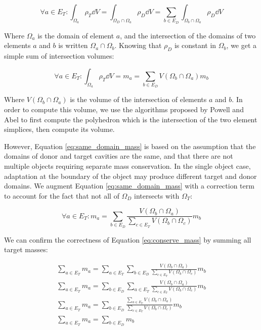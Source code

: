 \begin{equation}
\forall a \in E_T: \int_{\Omega_a} \rho_T \dd V
= \int_{\Omega_D \cap \Omega_a} \rho_D \dd V
= \sum_{b \in E_D} \int_{\Omega_b \cap \Omega_a} \rho_D \dd V
\end{equation}

Where $\Omega_a$ is the domain of element $a$, and the intersection of the
domains of two elements $a$ and $b$ is written $\Omega_a \cap \Omega_b$.
Knowing that $\rho_D$ is constant in $\Omega_b$, we get a simple
sum of intersection volumes:

\begin{equation} \label{eq:same_domain_mass}
\forall a \in E_T: \int_{\Omega_a} \rho_T \dd V = m_a
= \sum_{b \in E_D} V(\Omega_b \cap \Omega_a) m_b
\end{equation}

Where $V(\Omega_b \cap \Omega_a)$ is the volume of the intersection of elements $a$ and $b$.
In order to compute this volume, we use the algorithms
proposed by Powell and Abel \cite{powell2015exact} to first compute the polyhedron
which is the intersection of the two element simplices, then compute
its volume.

However, Equation \ref{eq:same_domain_mass} is based on the assumption
that the domains of donor and target cavities are the same, and that
there are not multiple objects requiring separate mass conservation.
In the single object case, adaptation at the boundary of the object may
produce different target and donor domains.
We augment Equation \ref{eq:same_domain_mass} with a correction term
to account for the fact that not all of $\Omega_D$ intersects with $\Omega_T$:

\begin{equation} \label{eq:conserve_mass}
\forall a \in E_T: m_a
= \sum_{b \in E_D} \frac{V(\Omega_b \cap \Omega_a)}
{\sum_{c \in E_T} V(\Omega_b \cap \Omega_c)} m_b
\end{equation}

We can confirm the correctness of Equation \ref{eq:conserve_mass} by
summing all target masses:

\begin{gather*}
\sum_{a \in E_T} m_a
= \sum_{a \in E_T} \sum_{b \in E_D} \frac{V(\Omega_b \cap \Omega_a)}
{\sum_{c \in E_T} V(\Omega_b \cap \Omega_c)} m_b \\
\sum_{a \in E_T} m_a
= \sum_{b \in E_D} \sum_{a \in E_T} \frac{V(\Omega_b \cap \Omega_a)}
{\sum_{c \in E_T} V(\Omega_b \cap \Omega_c)} m_b \\
\sum_{a \in E_T} m_a
= \sum_{b \in E_D} \frac{\sum_{a \in E_T} V(\Omega_b \cap \Omega_a)}
{\sum_{c \in E_T} V(\Omega_b \cap \Omega_c)} m_b \\
\sum_{a \in E_T} m_a
= \sum_{b \in E_D} m_b \\
\end{gather*}

